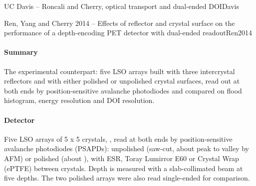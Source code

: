 \begin{programnote}{UC Davis -- Roncali and Cherry, optical transport and dual-ended DOI}{Davis}
\begin{papernote}{Ren, Yang and Cherry 2014 -- Effects of reflector and crystal surface on the performance of a depth-encoding PET detector with dual-ended readout}{Ren2014}
\paragraph{Summary}
The experimental counterpart: five LSO arrays built with three intercrystal
reflectors and with either polished or unpolished crystal surfaces, read out at
both ends by position-sensitive avalanche photodiodes and compared on flood
histogram, energy resolution and DOI resolution.

\paragraph{Detector}
Five LSO arrays of 5 x 5 crystals, , read at
both ends by position-sensitive avalanche photodiodes (PSAPDs): unpolished
(saw-cut, about  peak to valley by AFM) or polished (about ),
with ESR, Toray Lumirror E60 or Crystal Wrap (ePTFE) between crystals. Depth
is measured with a slab-collimated  beam at five depths. The two
polished arrays were also read single-ended for comparison.


\end{papernote}
\end{programnote}
